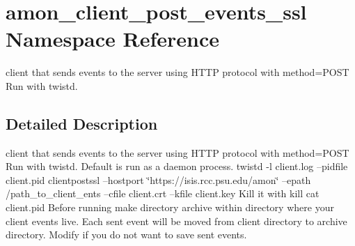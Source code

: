 \hypertarget{namespaceamon__client__post__events__ssl}{\section{amon\-\_\-client\-\_\-post\-\_\-events\-\_\-ssl Namespace Reference}
\label{namespaceamon__client__post__events__ssl}
}


client that sends events to the server using H\-T\-T\-P protocol with method=P\-O\-S\-T Run with twistd.  




\subsection{Detailed Description}
client that sends events to the server using H\-T\-T\-P protocol with method=P\-O\-S\-T Run with twistd. Default is run as a daemon process. twistd -\/l client.\-log --pidfile client.\-pid clientpostssl --hostport \char`\"{}https\-://isis.\-rcc.\-psu.\-edu/amon\char`\"{} --epath /path\-\_\-to\-\_\-client\-\_\-ents --cfile client.\-crt --kfile client.\-key Kill it with kill {\ttfamily cat client.\-pid} Before running make directory archive within directory where your client events live. Each sent event will be moved from client directory to archive directory. Modify if you do not want to save sent events. 